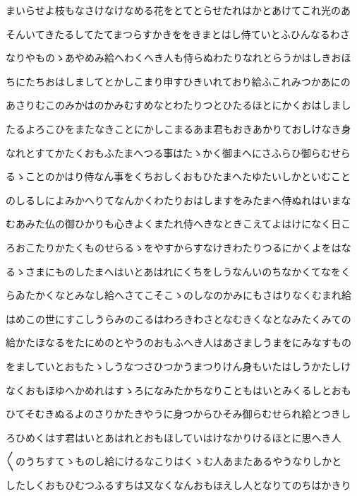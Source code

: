 \documentclass[a4paper,11pt,landscape]{ltjtarticle}
\begin{document}
\par\medskip
まいらせよ枝もなさけなけなめる花をとてとらせたれはかとあけてこれ光のあ
\par\medskip
そんいてきたるしてたてまつらすかきををきまとはし侍ていとふひんなるわさ
\par\medskip
なりやものゝあやめみ給へわくへき人も侍らぬわたりなれとらうかはしきおほ
\par\medskip
ちにたちおはしましてとかしこまり申すひきいれており給ふこれみつかあにの
\par\medskip
あさりむこのみかはのかみむすめなとわたりつとひたるほとにかくおはしまし
\par\medskip
たるよろこひをまたなきことにかしこまるあま君もおきあかりておしけなき身
\par\medskip
なれとすてかたくおもふたまへつる事はたゝかく御まへにさふらひ御らむせら
\par\medskip
るゝことのかはり侍なん事をくちおしくおもひたまへたゆたいしかといむこと
\par\medskip
のしるしによみかへりてなんかくわたりおはしますをみたまへ侍ぬれはいまな
\par\medskip
むあみた仏の御ひかりも心きよくまたれ侍へきなときこえてよはけになく日こ
\par\medskip
ろおこたりかたくものせらるゝをやすからすなけきわたりつるにかくよをはな
\par\medskip
るゝさまにものしたまへはいとあはれにくちをしうなんいのちなかくてなをく
\par\medskip
らゐたかくなとみなし給へさてこそこゝのしなのかみにもさはりなくむまれ給
\par\medskip
はめこの世にすこしうらみのこるはわろきわさとなむきくなとなみたくみての
\par\medskip
給かたほなるをたにめのとやうのおもふへき人はあさましうまをにみなすもの
\par\medskip
をましていとおもたゝしうなつさひつかうまつりけん身もいたはしうかたしけ
\par\medskip
なくおもほゆへかめれはすゝろになみたかちなりこともはいとみくるしとおも
\par\medskip
ひてそむきぬるよのさりかたきやうに身つからひそみ御らむせられ給とつきし
\par\medskip
ろひめくはす君はいとあはれとおもほしていはけなかりけるほとに思へき人
\par\medskip
〱のうちすてゝものし給にけるなこりはくゝむ人あまたあるやうなりしかと
\par\medskip
したしくおもひむつふるすちは又なくなんおもほえし人となりてのちはかきり
\end{document}
